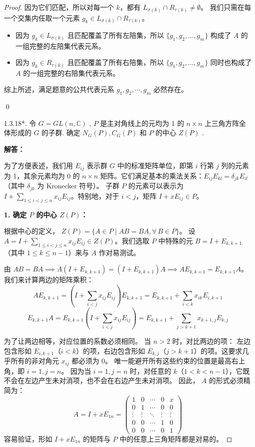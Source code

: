 \documentclass[]{article}
\begin{document}
\begin{proof}
因为它们匹配，所以对每一个 $k$，都有 $L_{\sigma(k)} \cap R_{\tau(k)} \neq \emptyset$。
我们只需在每一个交集内任取一个元素 $g_k \in L_{\sigma(k)} \cap R_{\tau(k)}$。
\begin{itemize}
	\item 因为 $g_k \in L_{\sigma(k)}$ 且匹配覆盖了所有左陪集，所以 $\{g_1, g_2, \dots, g_m\}$ 构成了 $A$ 的一组完整的左陪集代表元系。
	\item 因为 $g_k \in R_{\tau(k)}$ 且匹配覆盖了所有右陪集，所以 $\{g_1, g_2, \dots, g_m\}$ 同时也构成了 $A$ 的一组完整的右陪集代表元系。
\end{itemize}

综上所述，满足题意的公共代表元系 $g_{1}, g_{2}, \cdots, g_{m}$ 必然存在。

\qed

1.3.18*. 令 $G = GL(n, \mathbb{C})$ , $P$ 是主对角线上的元均为 1 的 $n \times n$ 上三角方阵全体形成的 $G$ 的子群. 确定 $N_G(P), C_G(P)$ 和 $P$ 的中心 $Z(P)$ .  
	
\bigskip
\noindent \textbf{解答：} 

为了方便表述，我们用 $E_{ij}$ 表示群 $G$ 中的标准矩阵单位，即第 $i$ 行第 $j$ 列的元素为 1，其余元素均为 0 的 $n \times n$ 矩阵。它们满足基本的乘法关系：$E_{ij}E_{kl} = \delta_{jk}E_{il}$（其中 $\delta_{jk}$ 为 Kronecker 符号）。
子群 $P$ 的元素可以表示为 $I + \sum_{1 \le i < j \le n} x_{ij}E_{ij}$。特别地，对于 $i < j$，矩阵 $I + xE_{ij} \in P$。

\bigskip
\noindent \textbf{1. 确定 $P$ 的中心 $Z(P)$：}

根据中心的定义， $Z(P) = \{ A \in P \mid AB = BA, \forall \, B \in P \}$。
设 $A = I + \sum_{1 \le i < j \le n} x_{ij}E_{ij} \in Z(P)$。我们选取 $P$ 中特殊的元 $B = I + E_{k,k+1}$（其中 $1 \le k \le n-1$）来与 $A$ 作对易测试。

由 $AB = BA \implies A(I + E_{k,k+1}) = (I + E_{k,k+1})A \implies AE_{k,k+1} = E_{k,k+1}A$。
我们来计算两边的矩阵乘积：
\[ AE_{k,k+1} = \left( I + \sum_{i<j} x_{ij}E_{ij} \right) E_{k,k+1} = E_{k,k+1} + \sum_{i<k} x_{ik}E_{i,k+1} \]
\[ E_{k,k+1}A = E_{k,k+1} \left( I + \sum_{i<j} x_{ij}E_{ij} \right) = E_{k,k+1} + \sum_{j>k+1} x_{k+1,j}E_{k,j} \]

为了让两边相等，对应位置的系数必须相同。
当 $n > 2$ 时，对比两边的项：
左边包含形如 $E_{i,k+1}$（$i < k$）的项，右边包含形如 $E_{k,j}$（$j > k+1$）的项。这要求几乎所有的非对角元 $x_{ij}$ 都必须为 0。
唯一能避开所有这些约束的位置是最高右上角，即 $i=1, j=n$。
因为当 $i=1, j=n$ 时，对任意的 $k$（$1 < k < n-1$），它既不会在左边产生未对消项，也不会在右边产生未对消项。
因此， $A$ 的形式必须精简为：
\[ A = I + xE_{1n} = \begin{pmatrix} 1 & 0 & \cdots & 0 & x \\ 0 & 1 & \cdots & 0 & 0 \\ \vdots & \vdots & \ddots & \vdots & \vdots \\ 0 & 0 & \cdots & 1 & 0 \\ 0 & 0 & \cdots & 0 & 1 \end{pmatrix} \]
容易验证，形如 $I + xE_{1n}$ 的矩阵与 $P$ 中的任意上三角矩阵都是对易的。


\end{proof}
\end{document}
